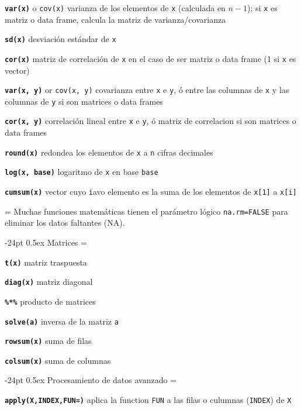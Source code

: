 \documentclass[10pt,landscape]{article}
\makeatletter
\renewcommand\section{\@startsection{section}{1}{0mm}%
                                     {-24pt}%
                                     {0.5ex}%
                                {\color[rgb]{1,0.54902,0}\normalfont\large\bfseries}}
\newcommand{\code}{\texttt}
\newcommand{\bcode}[1]{\texttt{\textbf{#1}}}
\makeatother
\begin{document}
\begin{multicols*}{3}
\bcode{var(x)} o \code{cov(x)}  varianza de los elementos de \code{x}
(calculada en $n-1$); si \code{x} es matriz o data frame, calcula la matriz de varianza/covarianza

\bcode{sd(x)} desviación estándar de \code{x}

\bcode{cor(x)}  matriz de correlación de \code{x} en el caso de ser matriz o data frame (1 si \code{x} es vector)

\bcode{var(x, y)} or \code{cov(x, y)}  covarianza entre \code{x} e \code{y}, ó entre las columnas de \code{x} y las columnas de \code{y} si son matrices o data frames

\bcode{cor(x, y)}  correlación lineal entre \code{x} e \code{y}, ó matriz de correlacion si son matrices o data frames

\bcode{round(x)} redondea los elementos de \code{x} a \code{n} cifras decimales

\bcode{log(x, base)} logaritmo de \code{x} en base \code{base}

\bcode{cumsum(x)} vector cuyo \code{i}avo elemento es la suma de los elementos de \code{x[1]} a \code{x[i]}

\everypar={\hangindent=0mm}
Muchas funciones matemáticas tienen el parámetro lógico \code{na.rm=FALSE} para eliminar los datos faltantes (NA).




\section{Matrices}
\everypar={\hangindent=9mm}

\bcode{t(x)} matriz traspuesta

\bcode{diag(x)} matriz diagonal

\bcode{\%*\%} producto de matrices

\bcode{solve(a)} inversa de la matriz \code{a}

\bcode{rowsum(x)} suma de filas

\bcode{colsum(x)} suma de columnas 






\section{Procesamiento de datos avanzado}
\everypar={\hangindent=9mm}

\bcode{apply(X,INDEX,FUN=)} aplica la function \code{FUN} a las filas o culumnas (\code{INDEX}) de \code{X}


\end{multicols*}
\end{document}
